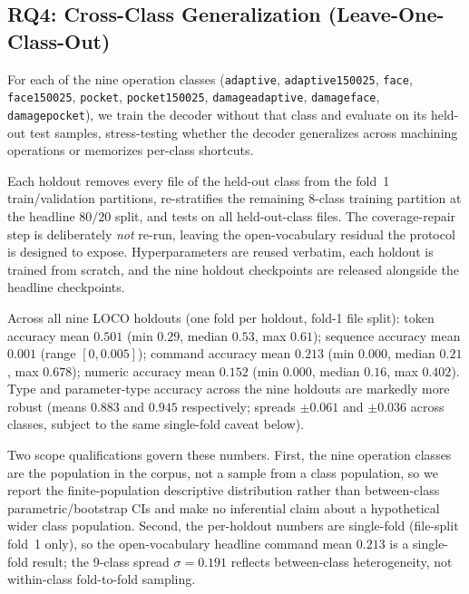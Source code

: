 \documentclass[sensors,article,submit,moreauthors,pdftex]{Definitions/mdpi}
\begin{document}
\subsection{RQ4: Cross-Class Generalization (Leave-One-Class-Out)}
\label{sec:loco}

For each of the nine operation classes (\texttt{adaptive}, \texttt{adaptive150025}, \texttt{face}, \texttt{face150025}, \texttt{pocket}, \texttt{pocket150025}, \texttt{damageadaptive}, \texttt{damageface}, \texttt{damagepocket}), we train the decoder without that class and evaluate on its held-out test samples, stress-testing whether the decoder generalizes across machining operations or memorizes per-class shortcuts.

Each holdout removes every file of the held-out class from the fold~1 train/validation partitions, re-stratifies the remaining $8$-class training partition at the headline $80/20$ split, and tests on all held-out-class files. The coverage-repair step is deliberately \emph{not} re-run, leaving the open-vocabulary residual the protocol is designed to expose. Hyperparameters are reused verbatim, each holdout is trained from scratch, and the nine holdout checkpoints are released alongside the headline checkpoints.

Across all nine LOCO holdouts (one fold per holdout, fold-1 file split): token accuracy mean $0.501$ (min $0.29$, median $0.53$, max $0.61$); sequence accuracy mean $0.001$ (range $[0, 0.005]$); command accuracy mean $0.213$ (min $0.000$, median $0.21$, max $0.678$); numeric accuracy mean $0.152$ (min $0.000$, median $0.16$, max $0.402$). Type and parameter-type accuracy across the nine holdouts are markedly more robust (means $0.883$ and $0.945$ respectively; spreads $\pm 0.061$ and $\pm 0.036$ across classes, subject to the same single-fold caveat below).

Two scope qualifications govern these numbers. First, the nine operation classes are the population in the corpus, not a sample from a class population, so we report the finite-population descriptive distribution rather than between-class parametric/bootstrap CIs and make no inferential claim about a hypothetical wider class population. Second, the per-holdout numbers are single-fold (file-split fold~1 only), so the open-vocabulary headline command mean $0.213$ is a single-fold result; the 9-class spread $\sigma = 0.191$ reflects between-class heterogeneity, not within-class fold-to-fold sampling.
\end{document}
